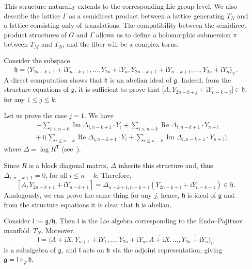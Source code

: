 \documentclass[pdftex]{sigma}
\newcommand{\C}{{\mathbb C}}
\newcommand{\6}{\partial}
\renewcommand{\Re}{\operatorname{Re}}
\renewcommand{\Im}{\operatorname{Im}}
\numberwithin{equation}{section}
\begin{document}
This structure naturally extends to the corresponding Lie group level.
We also describe the lattice $\Gamma$ as a semidirect product between a lattice generating $T_N$ and a lattice consisting only of translations. The compatibility between the semidirect product structures of $G$ and $\Gamma$ allows us to define a holomorphic submersion $\pi$ between $T_M$ and $T_N$, and the fiber will be a complex torus.

Consider the subspace
\[
\mathfrak{h} = \bigl\langle Y_{2n-k + 1} + \mathrm{i} Y_{n-k+1}, \dots , Y_{2n} + \mathrm{i} Y_n, \overline{Y_{2n-k + 1} + \mathrm{i} Y_{n-k+1}}, \dots , \overline{Y_{2n} + \mathrm{i} Y_n} \bigr\rangle_\C.
 \]
A direct computation shows that $\mathfrak{h}$ is an abelian ideal of $\mathfrak{g}$. Indeed, from the structure equations of $\mathfrak{g}$, it is sufficient to prove that $\bigl[A,Y_{2n-k + j} + \mathrm{i} Y_{n-k+j}\bigr] \in \mathfrak{h}$, for any $ 1 \leq j \leq k$.

Let us prove the case $j=1$. We have{\samepage
\begin{align*}
[A, Y_{2n-k+1} + \mathrm{i} Y_{n-k+1}]
 &= -\sum_{i \leq n-k} \Im \Delta_{i, n-k+1} \cdot Y_i
 + \sum_{i \leq n-k} \Re \Delta_{i, n-k+1} \cdot Y_{n+i} \\
 &\quad + \mathrm{i} \biggl( \sum_{i \leq n-k} \Re \Delta_{i, n-k+1} \cdot Y_i
 + \sum_{i \leq n-k} \Im \Delta_{i, n-k+1} \cdot Y_{n+i} \biggr),
\end{align*}
where $\Delta = \log R^{\mathsf{T}}$ (see~\cite[Theorem~3.1]{cos}).}

Since $R$ is a block diagonal matrix, $\Delta$ inherits this structure and, thus $\Delta_{i, n-k+1}=0$, for all $i\leq n-k$.
Therefore,
\[
[A, Y_{2n-k+1} + \mathrm{i} Y_{n-k+1}]=\Delta_{n-k+1, n-k+1}(Y_{2n-k+1}+\mathrm{i}Y_{n-k+1})\in \mathfrak{h}.
\]
Analogously, we can prove the same thing for any $j$, hence, $\mathfrak{h}$ is ideal of $\mathfrak{g}$ and from the structure equations it is clear that $\mathfrak{h}$ is abelian.


Consider $\mathfrak{l}:=\mathfrak{g}/\mathfrak{h}$. Then $\mathfrak{l}$ is the Lie algebra corresponding to the Endo--Pajitnov manifold~$T_N$.
Moreover,
\[
 \mathfrak{l} = \bigl\langle A+\mathrm{i}X, Y_{n+ 1} + \mathrm{i} Y_{1}, \dots , Y_{2n} + \mathrm{i} Y_n, \overline{A+\mathrm{i}X}, \dots , \overline{ Y_{2n} + \mathrm{i} Y_n} \bigr\rangle_\C
 \]
 is a subalgebra of $\mathfrak{g}$, and $\mathfrak{l}$ acts on $\mathfrak{h}$ via the adjoint representation, giving $\mathfrak{g}=\mathfrak{l} \rtimes_\varphi \mathfrak{h}$.
\end{document}
